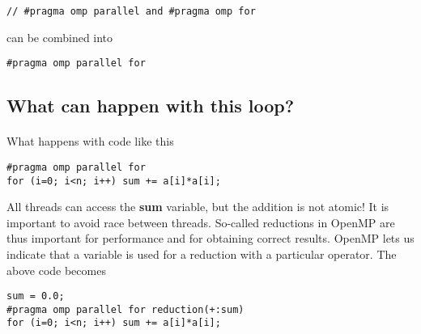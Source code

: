 \documentclass[%
oneside,                 %
final,                   %
10pt]{article}
\begin{document}
\noindent


\begin{verbatim}
// #pragma omp parallel and #pragma omp for

\end{verbatim}

can be combined into


\begin{verbatim}
#pragma omp parallel for

\end{verbatim}



\subsection*{What can happen with this loop?}


\paragraph{}
What happens with code like this 



\begin{verbatim}
#pragma omp parallel for
for (i=0; i<n; i++) sum += a[i]*a[i];

\end{verbatim}

All threads can access the \textbf{sum} variable, but the addition is not atomic! It is important to avoid race between threads. So-called reductions in OpenMP are thus important for performance and for obtaining correct results.  OpenMP lets us indicate that a variable is used for a reduction with a particular operator. The above code becomes




\begin{verbatim}
sum = 0.0;
#pragma omp parallel for reduction(+:sum)
for (i=0; i<n; i++) sum += a[i]*a[i];

\end{verbatim}
\end{document}
